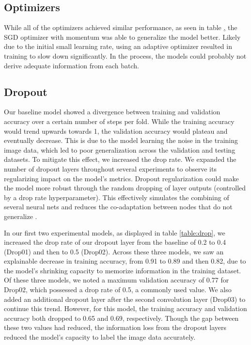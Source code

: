 \documentclass{article}
\begin{document}
\subsection{Optimizers}

While all of the optimizers achieved similar performance, as seen in table \href{table:optim}, the SGD optimizer with momentum was able to generalize the model better. Likely due to the initial small learning rate, using an adaptive optimizer resulted in training to slow down significantly. In the process, the models could probably not derive adequate information from each batch.

\subsection{Dropout}

Our baseline model showed a divergence between training and validation accuracy over a certain number of steps per fold. While the training accuracy would trend upwards towards 1, the validation accuracy would plateau and eventually decrease. This is due to the model learning the noise in the training image data, which led to poor generalization across the validation and testing datasets. To mitigate this effect, we increased the drop rate. We expanded the number of dropout layers throughout several experiments to observe its regularizing impact on the model’s metrics. Dropout regularization could make the model more robust through the random dropping of layer outputs (controlled by a drop rate hyperparameter). This effectively simulates the combining of several neural nets and reduces the co-adaptation between nodes that do not generalize \cite{JMLR:v15:srivastava14a}. 

In our first two experimental models, as displayed in table \ref{table:drop}, we increased the drop rate of our dropout layer from the baseline of 0.2 to 0.4 (Drop01) and then to 0.5 (Drop02). Across these three models, we saw an explainable decrease in training accuracy, from 0.91 to 0.89 and then 0.82, due to the model’s shrinking capacity to memorize information in the training dataset. Of these three models, we noted a maximum validation accuracy of 0.77 for Drop02, which possessed a drop rate of 0.5, a commonly used value. We also added an additional dropout layer after the second convolution layer (Drop03) to continue this trend. However, for this model, the training accuracy and validation accuracy both dropped to 0.65 and 0.69, respectively. Though the gap between these two values had reduced, the information loss from the dropout layers reduced the model’s capacity to label the image data accurately.
\end{document}
